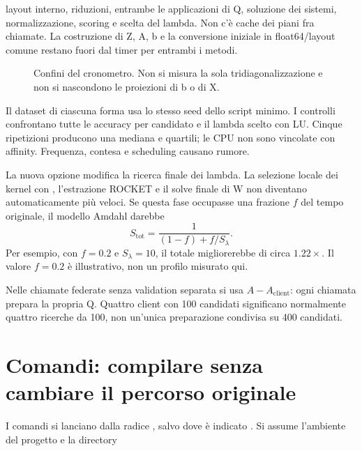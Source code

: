 \documentclass[11pt,a4paper]{article}
\newcommand{\cod}[1]{\texttt{\detokenize{#1}}}
\newcommand{\page}[1]{\clearpage\section{#1}}
\begin{document}
layout interno, riduzioni, entrambe le applicazioni di Q, soluzione dei
sistemi, normalizzazione, scoring e scelta del lambda. Non c'è cache dei
piani fra chiamate. La costruzione di Z, A, b e la conversione iniziale in
float64/layout comune restano fuori dal timer per entrambi i metodi.
\begin{figure}[H]\centering
{}
\caption{Confini del cronometro. Non si misura la sola tridiagonalizzazione e non si nascondono le proiezioni di b o di X.}
\end{figure}
Il dataset di ciascuna forma usa lo stesso seed dello script minimo. I
controlli confrontano tutte le accuracy per candidato e il lambda scelto
con LU. Cinque ripetizioni producono una mediana e quartili; le CPU non
sono vincolate con affinity. Frequenza, contesa e scheduling causano rumore.
\begin{idea}[title={Speedup della fase, non dell'intero addestramento}]
La nuova opzione modifica la ricerca finale dei lambda. La selezione
locale dei kernel con \cod{RidgeClassifierCV}, l'estrazione ROCKET e il
solve finale di W non diventano automaticamente più veloci.
Se questa fase occupasse una frazione $f$ del tempo originale, il modello
Amdahl darebbe
\[
S_{\mathrm{tot}}=\frac{1}{(1-f)+f/S_\lambda}.
\]
Per esempio, con $f=0.2$ e $S_\lambda=10$, il totale migliorerebbe di circa
$1.22\times$. Il valore $f=0.2$ è illustrativo, non un profilo misurato qui.
\end{idea}
Nelle chiamate federate senza validation separata si usa
$A-A_{\text{client}}$: ogni chiamata prepara la propria Q. Quattro client
con 100 candidati significano normalmente quattro ricerche da 100, non
un'unica preparazione condivisa su 400 candidati.
\page{Comandi: compilare senza cambiare il percorso originale}
I comandi si lanciano dalla radice \cod{fed2rc_parallel}, salvo dove è
indicato \cod{cd code}. Si assume l'ambiente del progetto e la directory
\end{document}
